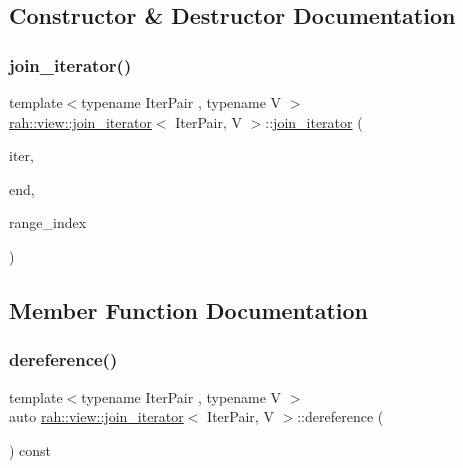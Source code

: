 \subsection{Constructor \& Destructor Documentation}
\mbox{\label{structrah_1_1view_1_1join__iterator_aba8a1b69394f3be6cf7fa1425ab67c48}} 
\subsubsection{\texorpdfstring{join\_iterator()}{join\_iterator()}}
{\footnotesize\ttfamily template$<$typename Iter\+Pair , typename V $>$ \\
\mbox{\hyperlink{structrah_1_1view_1_1join__iterator}{rah\+::view\+::join\+\_\+iterator}}$<$ Iter\+Pair, V $>$\+::\mbox{\hyperlink{structrah_1_1view_1_1join__iterator}{join\+\_\+iterator}} (\begin{DoxyParamCaption}\item[{Iter\+Pair const \&}]{iter,  }\item[{Iter\+Pair const \&}]{end,  }\item[{size\+\_\+t}]{range\+\_\+index }\end{DoxyParamCaption})\hspace{0.3cm}{\ttfamily [inline]}}



\subsection{Member Function Documentation}
\mbox{\label{structrah_1_1view_1_1join__iterator_ad8eb100fae143db58474cdb02336fa84}} 
\subsubsection{\texorpdfstring{dereference()}{dereference()}}
{\footnotesize\ttfamily template$<$typename Iter\+Pair , typename V $>$ \\
auto \mbox{\hyperlink{structrah_1_1view_1_1join__iterator}{rah\+::view\+::join\+\_\+iterator}}$<$ Iter\+Pair, V $>$\+::dereference (\begin{DoxyParamCaption}{ }\end{DoxyParamCaption}) const\hspace{0.3cm}{\ttfamily [inline]}}

